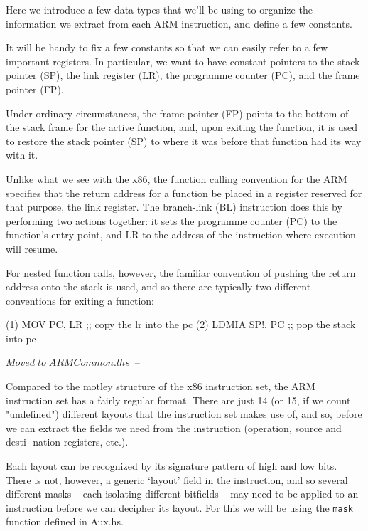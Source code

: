 \documentclass{article}
\newcommand{\Conid}[1]{\mathit{#1}}
\newcommand{\Varid}[1]{\mathit{#1}}
\def\resethooks{%
  \global\let\SaveRestoreHook\empty
  \global\let\ColumnHook\empty}
\let\hspre\empty
\let\hspost\empty
\begin{document}
Here we introduce a few data types that we'll be using to
organize the information we extract from each ARM instruction,
and define a few constants.

It will be handy to fix a few constants so that we can easily
refer to a few important registers. In particular, we want to
have constant pointers to the stack pointer (SP), the link
register (LR), the programme counter (PC), and the frame pointer
(FP).

Under ordinary circumstances, the frame pointer (FP) points to
the bottom of the stack frame for the active function, and, upon
exiting the function, it is used to restore the stack pointer (SP)
to where it was before that function had its way with it.

Unlike what we see with the x86, the function calling convention
for the ARM specifies that the return address for a function be
placed in a register reserved for that purpose, the link register.
The branch-link (BL) instruction does this by performing two actions
together: it sets the programme counter (PC) to the function's entry
point, and LR to the address of the instruction where execution will
resume.

For nested function calls, however, the familiar convention of pushing
the return address onto the stack is used, and so there are typically
two different conventions for exiting a function:

(1) MOV     PC, LR     ;; copy the lr into the pc
(2) LDMIA   SP!, {PC}  ;; pop the stack into pc

\begin{hscode}\SaveRestoreHook
\column{B}{@{}>{\hspre}l<{\hspost}@{}}%
\column{3}{@{}>{\hspre}l<{\hspost}@{}}%
\column{E}{@{}>{\hspre}l<{\hspost}@{}}%
\>[3]{}\mbox{\onelinecomment  \ensuremath{\Conid{Moved}\;\Varid{to}\;\Varid{\Conid{ARMCommon}.lhs}} --}{}\<[E]%
\ColumnHook
\end{hscode}\resethooks


Compared to the motley structure of the x86 instruction set, the
ARM instruction set has a fairly regular format. There are just
14 (or 15, if we count "undefined") different layouts that the
instruction set makes use of, and so, before we can extract the
fields we need from the instruction (operation, source and desti-
nation registers, etc.).

Each layout can be recognized by its signature pattern of high
and low bits. There is not, however, a generic `layout' field
in the instruction, and so several different masks -- each isolating
different bitfields -- may need to be applied to an instruction
before we can decipher its layout. For this we will be using the
\texttt{mask} function defined in Aux.hs.
\end{document}
